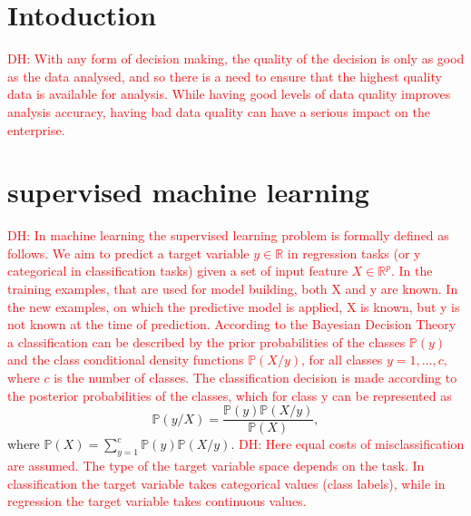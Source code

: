 \documentclass{article}
\newcommand\dhawat[1]{\textcolor{red}{DH: #1}}
\begin{document}
\section{Intoduction} %
\label{sec:Intoduction}
\dhawat{With any form of decision making, the quality of the decision is only as good as the data analysed, and so there is a need to ensure that the highest quality data is available for analysis. While having good levels of data quality improves analysis accuracy, having bad data quality can have a serious impact on the enterprise. }




\section{supervised machine learning}
\dhawat{In machine learning the supervised learning problem is formally defined as follows.
    We aim to predict a target variable $y \in \mathbb{R}$ in regression tasks (or y categorical in classification tasks) given a set of input feature $X \in \mathbb{R}^p$.
    In the training examples, that are used for model building, both X and y are known.
    In the new examples, on which the predictive model is applied, X is known, but y is not known at the time of prediction.
    According to the Bayesian Decision Theory a classification can
    be described by the prior probabilities of the classes $\mathbb{P}(y)$ and the class conditional density functions $\mathbb{P}(X/y)$, for all classes $y=1,...,c,$ where $c$ is the number of classes.
    The classification decision is made according to the posterior probabilities of the classes, which for class y can be represented as}
$$\mathbb{P}(y/X) = \frac{\mathbb{P}(y)\mathbb{P}(X/y)}{\mathbb{P}(X)},$$
where $\mathbb{P}(X)= \sum_{y=1}^c \mathbb{P}(y)\mathbb{P}(X/y)$.
\dhawat{Here equal costs of misclassification are assumed.
    The type of the target variable space depends on the task.
    In classification the target variable takes categorical values (class labels), while in regression the target variable takes continuous values.}
\end{document}
